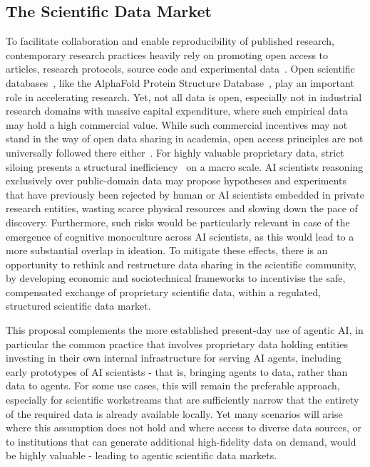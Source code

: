 \documentclass[11pt, a4paper, twocolumn, goog]{google}
\begin{document}
\subsection{The Scientific Data Market}

To facilitate collaboration and enable reproducibility of published research, contemporary research practices heavily rely on promoting open access to articles, research protocols, source code and experimental data~\citep{arzberger2004promoting, uhlir2007open, murray2008open, evans2009open, national2018open, burgelman2019open}. Open scientific databases~\citep{rauluseviciute2024jaspar, horton2025accelerated}, like the AlphaFold Protein Structure Database~\citep{varadi2022alphafold}, play an important role in accelerating research. Yet, not all data is open, especially not in industrial research domains with massive capital expenditure, where such empirical data may hold a high commercial value. While such commercial incentives may not stand in the way of open data sharing in academia, open access principles are not universally followed there either~\citep{andreoli2014open}. For highly valuable proprietary data, strict siloing presents a structural inefficiency~\citep{esanu2003economic} on a macro scale. AI scientists reasoning exclusively over public-domain data may propose hypotheses and experiments that have previously been rejected by human or AI scientists embedded in private research entities, wasting scarce physical resources and slowing down the pace of discovery. Furthermore, such risks would be particularly relevant in case of the emergence of cognitive monoculture across AI scientists, as this would lead to a more substantial overlap in ideation. To mitigate these effects, there is an opportunity to rethink and restructure data sharing in the scientific community, by developing economic and sociotechnical frameworks to incentivise the safe, compensated exchange of proprietary scientific data, within a regulated, structured scientific data market.

This proposal complements the more established present-day use of agentic AI, in particular the common practice that involves proprietary data holding entities investing in their own internal infrastructure for serving AI agents, including early prototypes of AI scientists - that is, bringing agents to data, rather than data to agents. For some use cases, this will remain the preferable approach, especially for scientific workstreams that are sufficiently narrow that the entirety of the required data is already available locally. Yet many scenarios will arise where this assumption does not hold and where access to diverse data sources, or to institutions that can generate additional high-fidelity data on demand, would be highly valuable - leading to agentic scientific data markets.
\end{document}
